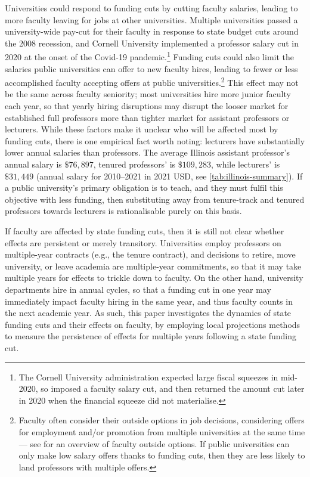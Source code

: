 Universities could respond to funding cuts by cutting faculty salaries, leading to more faculty leaving for jobs at other universities.
Multiple universities passed a university-wide pay-cut for their faculty in response to state budget cuts around the 2008 recession, and Cornell University implemented a professor salary cut in 2020 at the onset of the Covid-19 pandemic.\footnote{
    The Cornell University administration expected large fiscal squeezes in mid-2020, so imposed a faculty salary cut, and then returned the amount cut later in 2020 when the financial squeeze did not materialise.}
Funding cuts could also limit the salaries public universities can offer to new faculty hires, leading to fewer or less accomplished faculty accepting offers at public universities.\footnote{
    Faculty often consider their outside options in job decisions, considering offers for employment and/or promotion from multiple universities at the same time --- see \cite{blackaby2005} for an overview of faculty outside options.
    If public universities can only make low salary offers thanks to funding cuts, then they are less likely to land professors with multiple offers.
}
This effect may not be the same across faculty seniority; most universities hire more junior faculty each year, so that yearly hiring disruptions may disrupt the looser market for established full professors more than tighter market for assistant professors or lecturers.
While these factors make it unclear who will be affected most by funding cuts, there is one empirical fact worth noting: lecturers have substantially lower annual salaries than professors.
The average Illinois assistant professor's annual salary is $\$76,897$, tenured professors' is $\$109,283$, while lecturers' is $\$31,449$ (annual salary for 2010--2021 in 2021 USD, see \autoref{tab:illinois-summary}).
If a public university's primary obligation is to teach, and they must fulfil this objective with less funding, then substituting away from tenure-track and tenured professors towards lecturers is rationalisable purely on this basis.

If faculty are affected by state funding cuts, then it is still not clear whether effects are persistent or merely transitory.
Universities employ professors on multiple-year contracts (e.g., the tenure contract), and decisions to retire, move university, or leave academia are multiple-year commitments, so that it may take multiple years for effects to trickle down to faculty.
On the other hand, university departments hire in annual cycles, so that a funding cut in one year may immediately impact faculty hiring in the same year, and thus faculty counts in the next academic year.
As such, this paper investigates the dynamics of state funding cuts and their effects on faculty, by employing local projections methods to measure the persistence of effects for multiple years following a state funding cut.
